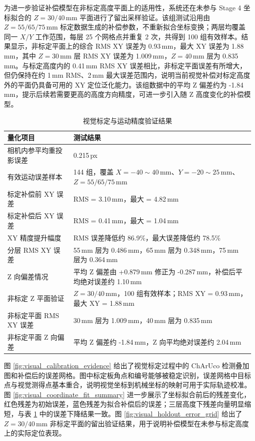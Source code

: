 ﻿\documentclass[UTF8,zihao=-4,fontset=windows]{ctexart}
\begin{document}
为进一步验证补偿模型在非标定高度平面上的适用性，系统还在未参与 Stage 4 坐标拟合的 $Z=30/40$\,mm 平面进行了留出采样验证。该组测试沿用由 $Z=55/65/75$\,mm 标定数据生成的补偿参数，不重新拟合坐标变换；两层均覆盖同一 $X/Y$ 工作范围，每层 25 个网格点并重复 2 次，共得到 100 组有效样本。结果显示，非标定平面上的综合 RMS XY 误差为 0.93\,mm，最大 XY 误差为 1.88\,mm，其中 $Z=30$\,mm 层 RMS XY 误差为 1.009\,mm，$Z=40$\,mm 层为 0.835\,mm。与标定高度内的 0.41\,mm RMS XY 误差相比，非标定平面误差有所增大，但仍保持在约 1\,mm RMS、2\,mm 最大误差范围内，说明当前视觉补偿对标定高度外的平面仍具备可用的 XY 定位泛化能力。该组数据中的平均 Z 偏差约为 -1.84\,mm，提示后续若需要更高的高度方向精度，可进一步引入随 Z 高度变化的补偿模型。

\begin{table}[htbp]
  \centering
  \begin{tabular}{p{}p{}}
    \toprule
    量化项目 & 测试结果 \\
    \midrule
    相机内参平均重投影误差 & 0.215\,px \\
    有效运动误差样本 & 144 组，覆盖 $X=-40\sim40$\,mm、$Y=-20\sim25$\,mm、$Z=55/65/75$\,mm \\
    标定补偿前 XY 误差 & RMS = 3.10\,mm，最大 = 4.82\,mm \\
    标定补偿后 XY 误差 & RMS = 0.41\,mm，最大 = 1.04\,mm \\
    XY 精度提升幅度 & RMS 误差降低约 86.9\%，最大误差降低约 78.5\% \\
    分层 RMS XY 误差 & 55\,mm 层为 0.486\,mm，65\,mm 层为 0.348\,mm，75\,mm 层为 0.364\,mm \\
    Z 向偏差情况 & 平均 Z 偏差由 +0.879\,mm 修正为 -0.287\,mm，补偿后平均绝对误差约 1.10\,mm \\
    非标定 Z 平面验证 & $Z=30/40$\,mm，100 组有效样本；RMS XY = 0.93\,mm，最大 XY = 1.88\,mm \\
    非标定平面 RMS XY 误差 & 30\,mm 层为 1.009\,mm，40\,mm 层为 0.835\,mm \\
    非标定平面 Z 向偏差 & 平均 Z 偏差约 -1.84\,mm，Z 向平均绝对误差约 2.04\,mm \\
    \bottomrule
  \end{tabular}
  \caption{视觉标定与运动精度验证结果}
  \label{tab:visual-motion-accuracy}
\end{table}

图 \ref{fig:visual_calibration_evidence} 给出了视觉标定过程中的 ChArUco 检测叠加图和补偿后的误差网格。图中标定板角点和编号能够被稳定识别，误差网格中目标点与视觉测得点基本重合，说明视觉坐标到机械坐标的映射可用于实际轨迹校准。图 \ref{fig:visual_coordinate_fit_summary} 进一步展示了坐标拟合前后的残差变化，红色残差为初始误差，蓝色残差为拟合补偿后的误差；三层高度下残差向量明显缩短，与表 \ref{tab:visual-motion-accuracy} 中的误差下降结果一致。图 \ref{fig:visual_holdout_error_grid} 给出了 $Z=30/40$\,mm 非标定平面的留出验证结果，用于说明补偿模型在未参与标定高度上的实际定位表现。
\end{document}
